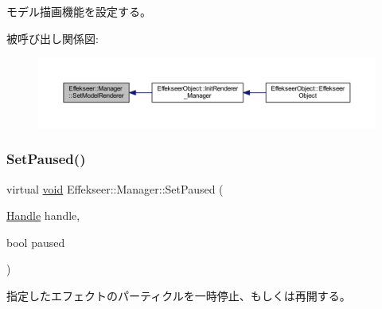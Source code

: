 モデル描画機能を設定する。 

被呼び出し関係図\+:\nopagebreak
\begin{figure}[H]
\begin{center}
\leavevmode
\includegraphics[width=350pt]{class_effekseer_1_1_manager_aa423ee424d0b713ac4939fc7faf39b9c_icgraph}
\end{center}
\end{figure}
\mbox{\label{class_effekseer_1_1_manager_a6414ea849302b7cef51b61a38c7ecd76}} 
\subsubsection{\texorpdfstring{Set\+Paused()}{SetPaused()}}
{\footnotesize\ttfamily virtual \mbox{\hyperlink{namespace_effekseer_ab34c4088e512200cf4c2716f168deb56}{void}} Effekseer\+::\+Manager\+::\+Set\+Paused (\begin{DoxyParamCaption}\item[{\mbox{\hyperlink{namespace_effekseer_afba58b8d812da862190e9bbfc040824a}{Handle}}}]{handle,  }\item[{bool}]{paused }\end{DoxyParamCaption})\hspace{0.3cm}{\ttfamily [pure virtual]}}



指定したエフェクトのパーティクルを一時停止、もしくは再開する。 


